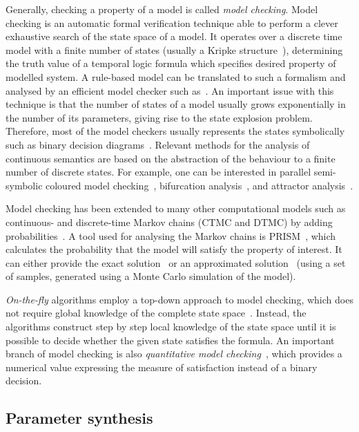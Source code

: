 \documentclass[11pt,a4paper]{report}
\begin{document}
Generally, checking a property of a model is called \emph{model checking}. Model checking is an automatic formal verification technique able to perform a clever exhaustive search of the state space of a model. It operates over a discrete time model with a finite number of states (usually a Kripke structure~\cite{kripke1963semantical}), determining the truth value of a temporal logic formula which specifies desired property of modelled system. A rule-based model can be translated to such a formalism and analysed by an efficient model checker such as~\cite{cimatti2002nusmv}. An important issue with this technique is that the number of states of a model usually grows exponentially in the number of its parameters, giving rise to the state explosion problem. Therefore, most of the model checkers usually represents the states symbolically~\cite{burch1992symbolic} such as binary decision diagrams~\cite{bryant2001graph}. Relevant methods for the analysis of continuous semantics are based on the abstraction of the behaviour to a finite number of discrete states. For example, one can be interested in parallel semi-symbolic coloured model checking~\cite{benevs2016model}, bifurcation analysis~\cite{benevs2017discrete}, and attractor analysis~\cite{benevs2018fully}.

Model checking has been extended to many other computational models such as continuous- and discrete-time Markov chains (CTMC and DTMC) by adding probabilities~\cite{kwiatkowska2010probabilistic}. A tool used for analysing the Markov chains is PRISM~\cite{kwiatkowska2011prism}, which calculates the probability that the model will satisfy the property of interest. It can either provide the exact solution~\cite{aziz2000model} or an approximated solution~\cite{jha2009bayesian} (using a set of samples, generated using a Monte Carlo simulation of the model). 

\emph{On-the-fly} algorithms employ a top-down approach to model checking, which does not require global knowledge of the complete state space~\cite{latella2014fly,bhat1995efficient,courcoubetis1992memory,gnesi2011abstract,holzmann2004spin}. Instead, the algorithms construct step by step local knowledge of the state space until it is possible to decide whether the given state satisfies the formula. An important branch of model checking is also \emph{quantitative model checking}~\cite{huth1997quantitative}, which provides a numerical value expressing the measure of satisfaction instead of a binary decision.

\subsection{Parameter synthesis}
\end{document}
